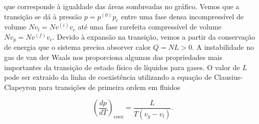 \begin{figure}[H]
\end{figure}
\noindent que corresponde à igualdade das áreas sombreadas no gráfico. Vemos que
a transição se dá à pressão $p=p^{(0)}p_c$ entre uma fase densa incompressível 
de volume $Nv_l=Nv^{(i)}v_c$ até uma fase rarefeita compressível de volume $Nv_g
=Nv^{(f)}v_c$. Devido à expansão na transição, vemos a partir da conservação de
energia que o sistema precisa absorver calor $Q=NL>0$. A instabilidade no gas de
van der Waals nos proporciona algumas das propriedades mais importantes da
transição de estado físico de líquidos para gases. O valor de $L$ pode ser
extraido da linha de coexistência utilizando a equação de Clausius-Clapeyron
para transições de primeira ordem em fluidos

$$\left(\frac{dp}{dT}\right)_\text{coex}=\frac{L}{T(v_g-v_l)}.$$

